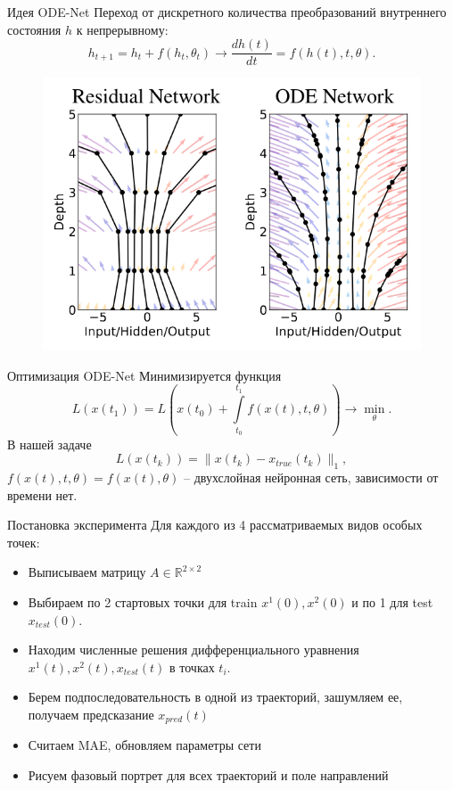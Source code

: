 \documentclass{beamer}
\begin{document}
\begin{frame}{Идея ODE-Net}
    Переход от дискретного количества преобразований внутреннего состояния $h$ к непрерывному:
    $$h_{t+1} = h_t + f(h_t, \theta_t) \to \frac{dh(t)}{dt} = f(h(t), t, \theta).$$
    \begin{figure}
     \centering
     \includegraphics[width=0.7\linewidth]{ODENet}
    \end{figure}
\end{frame}

\begin{frame}{Оптимизация ODE-Net}
 Минимизируется функция
 $$L(x(t_1)) = L\left(x(t_0) + \int\limits_{t_0}^{t_1} f(x(t), t, \theta)\right) \to \min_\theta.$$
 В нашей задаче
 $$L(x(t_k)) = \|x(t_k) - x_{true}(t_k)\|_1,$$
 $f(x(t), t, \theta) = f(x(t), \theta)$ -- двухслойная нейронная сеть, зависимости от времени нет.
\end{frame}

\begin{frame}{Постановка эксперимента}
 Для каждого из 4 рассматриваемых видов особых точек:
 \begin{itemize}
  \item Выписываем матрицу $A \in \mathbb{R}^{2 \times 2}$
  \item Выбираем по 2 стартовых точки для train $x^1(0), x^2(0)$ и по 1 для test $x_{test}(0)$.
  \item Находим численные решения дифференциального уравнения $x^1(t), x^2(t), x_{test}(t)$ в точках $t_i$.
  \item Берем подпоследовательность в одной из траекторий, зашумляем ее, получаем предсказание $x_{pred}(t)$
  \item Считаем MAE, обновляем параметры сети
  \item Рисуем фазовый портрет для всех траекторий и поле направлений
 \end{itemize}
\end{frame}
\end{document}
